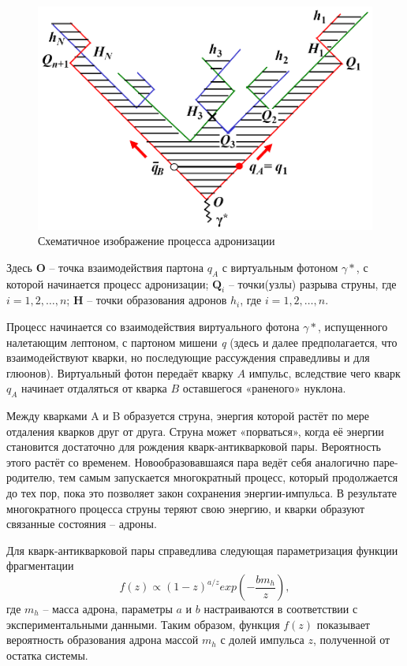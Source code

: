 \documentclass{extarticle}
\begin{document}
\begin{figure}[ht]
    \centering
    \includegraphics[width = 0.8\linewidth]{fragmentation.png}
    \caption{Схематичное изображение процесса адронизации \cite{LUND}}
    \label{fig:hadronization}
\end{figure} 

Здесь \textbf{O} – точка взаимодействия партона $q_A$ с виртуальным фотоном $\gamma*$, с которой начинается процесс адронизации; $\textbf{Q}_i$ – точки(узлы) разрыва струны, где $i = 1, 2, \dots, n$; \textbf{H} -- точки образования адронов $h_i$, где $i = 1, 2, \dots, n$.

Процесс начинается со взаимодействия виртуального фотона $\gamma*$, испущенного налетающим лептоном, с партоном мишени \textit{q} (здесь и далее предполагается, что взаимодействуют кварки, но последующие рассуждения справедливы и для глюонов). Виртуальный фотон передаёт кварку $A$ импульс, вследствие чего кварк $q_A$ начинает отдаляться от кварка $B$ оставшегося «раненого» нуклона. 

Между кварками A и B образуется струна, энергия которой растёт по мере отдаления кварков друг от друга. Струна может «порваться», когда её энергии становится достаточно для рождения кварк-антикварковой пары. Вероятность этого растёт со временем. Новообразовавшаяся пара ведёт себя аналогично паре-родителю, тем самым запускается многократный процесс, который продолжается до тех пор, пока это позволяет закон сохранения энергии-импульса. В результате многократного процесса струны теряют свою энергию, и кварки образуют связанные состояния – адроны. 

Для кварк-антикварковой пары справедлива следующая параметризация функции фрагментации
\begin{equation}
	f(z) \propto (1-z)^{a/z} exp(- \frac{b m_h}{z}),
\end{equation}
где $m_h$ – масса адрона, параметры $a$ и $b$ настраиваются в соответствии с экспериментальными данными. Таким образом, функция $f(z)$ показывает вероятность образования адрона массой $m_h$ с долей импульса $z$, полученной от остатка системы.
\end{document}
